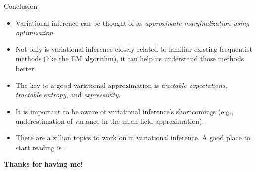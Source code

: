 \begin{frame}{Conclusion}

\begin{itemize}
%
\item Variational inference can be thought of as \emph{approximate marginalization using optimization}.
%
\item Not only is variational inference closely related to familiar existing
frequentist methods (like the EM algorithm), it can help us understand those
methods better.
%
\item The key to a good variational approximation is \emph{tractable
expectations}, \emph{tractable entropy}, and \emph{expressivity}.
%
\item It is important to be aware of variational inference's shortcomings (e.g.,
underestimation of variance in the mean field approximation).
%
\item There are a zillion topics to work on in variational inference.
A good place to start reading is \citet{blei2017variational}.
%
\end{itemize}

\begin{center}
    \textbf{Thanks for having me!}
\end{center}

\end{frame}
